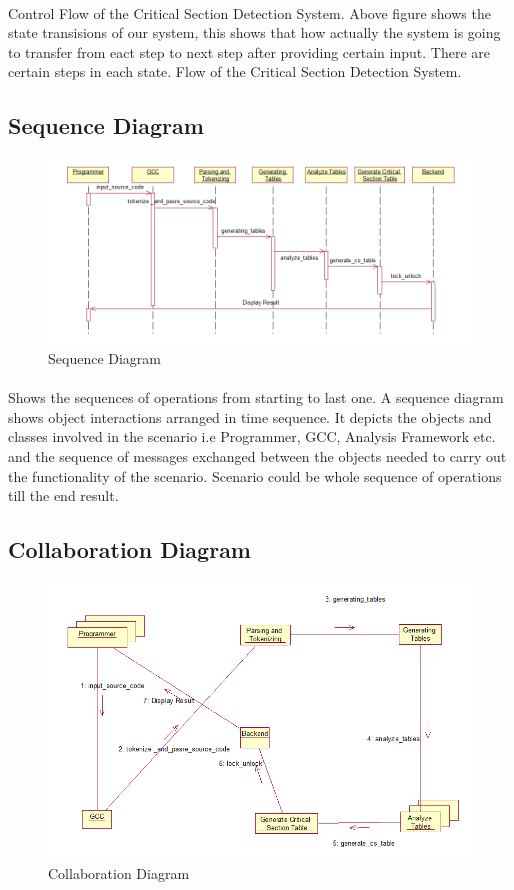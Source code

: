 \paragraph{}
Control Flow of the Critical Section Detection System.
Above figure shows the state transisions of our system, this shows that how actually the system is going to transfer from eact step to next step after providing certain input. There are certain steps in each state. Flow of the Critical Section Detection System.

\subsection{Sequence Diagram}
\begin{figure}[H]
\centering
\includegraphics[scale=0.5]{sequence.png}
\caption{Sequence Diagram}
\label{<<Label>>}
\end{figure}
\paragraph{}
Shows the sequences of operations from starting to last one. A sequence diagram shows object interactions arranged in time sequence. It depicts the objects and classes involved in the scenario i.e Programmer, GCC, Analysis Framework etc. and the sequence of messages exchanged between the objects needed to carry out the functionality of the scenario. Scenario could be whole sequence of operations till the end result.  

\subsection{Collaboration Diagram}
\begin{figure}[H]
\centering
\includegraphics[scale=0.6]{collaboration.png}
\caption{Collaboration Diagram}
\label{<<Label>>}
\end{figure}
